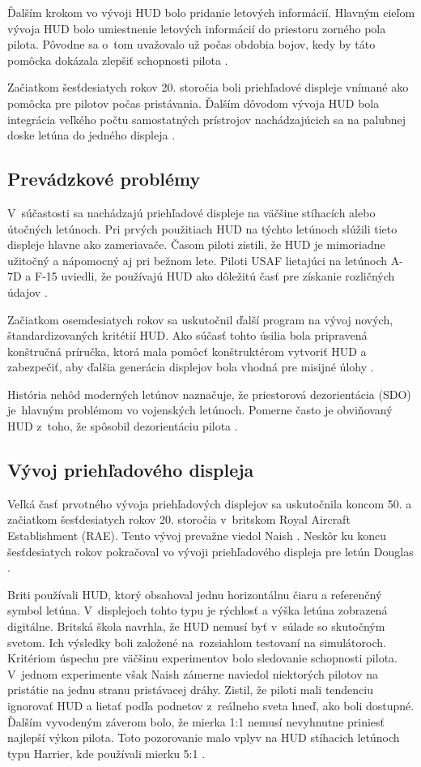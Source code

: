 Ďalším krokom vo vývoji HUD bolo pridanie letových informácií. Hlavným cieľom vývoja HUD bolo umiestnenie letových informácií do priestoru zorného pola pilota. Pôvodne sa o~tom uvažovalo už počas obdobia bojov, kedy by táto pomôcka dokázala zlepšiť schopnosti pilota \cite{HUDkniha}.

Začiatkom šesťdesiatych rokov 20. storočia boli priehľadové displeje vnímané ako pomôcka pre pilotov počas pristávania. Ďalším dôvodom vývoja HUD bola integrácia veľkého počtu samostatných prístrojov nachádzajúcich sa na palubnej doske letúna do jedného displeja \cite{HUDkniha}.

\subsection{Prevádzkové problémy}
V~súčastosti sa nachádzajú priehľadové displeje na väčšine stíhacích alebo útočných letúnoch. Pri prvých použitiach HUD na týchto letúnoch slúžili tieto displeje hlavne ako zameriavače. Časom piloti zistili, že HUD je mimoriadne užitočný a nápomocný aj pri bežnom lete. Piloti USAF lietajúci na letúnoch A-7D a F-15 uviedli, že používajú HUD ako dôležitú časť pre získanie rozličných údajov \cite{HUDknihaproblemy}.

Začiatkom osemdesiatych rokov sa uskutočnil ďalší program na vývoj nových, štandardizovaných kritétií HUD. Ako súčasť tohto úsilia bola pripravená konštručná príručka, ktorá mala pomôcť konštruktérom vytvoriť HUD a zabezpečiť, aby ďalšia generácia displejov bola vhodná pre misijné úlohy \cite{HUDknihaproblemy}.

História nehôd moderných letúnov naznačuje, že priestorová dezorientácia (SDO) je~hlavným problémom vo vojenských letúnoch. Pomerne často je obviňovaný HUD z~toho, že spôsobil dezorientáciu pilota \cite{HUDknihaproblemy}.

\subsection{Vývoj priehľadového displeja}
Veľká časť prvotného vývoja priehľadových displejov sa uskutočnila koncom 50. a začiatkom šesťdesiatych rokov 20. storočia v~britskom Royal Aircraft Establishment (RAE). Tento vývoj prevažne viedol Naish \cite{HUDkniha}. Neskôr ku koncu šesťdesiatych rokov pokračoval vo vývoji priehľadového displeja pre letún Douglas \cite{HUDkniha}.

Briti používali HUD, ktorý obsahoval jednu horizontálnu čiaru a referenčný symbol letúna. V~displejoch tohto typu je rýchlosť a výška letúna zobrazená digitálne. Britská škola navrhla, že HUD nemusí byť v~súlade so skutočným svetom. Ich výsledky boli založené na~rozsiahlom testovaní na simulátoroch. Kritériom úspechu pre väčšinu experimentov bolo sledovanie schopnosti pilota. V~jednom experimente však Naish zámerne naviedol niektorých pilotov na pristátie na jednu stranu pristávacej dráhy. Zistil, že piloti mali tendenciu ignorovať HUD a lietať podľa podnetov z~reálneho sveta hneď, ako boli dostupné. Ďalším vyvodeným záverom bolo, že mierka 1:1 nemusí nevyhnutne priniesť najlepší výkon pilota. Toto pozorovanie malo vplyv na HUD stíhacich letúnoch typu Harrier, kde používali mierku 5:1 \cite{HUDkniha}.

